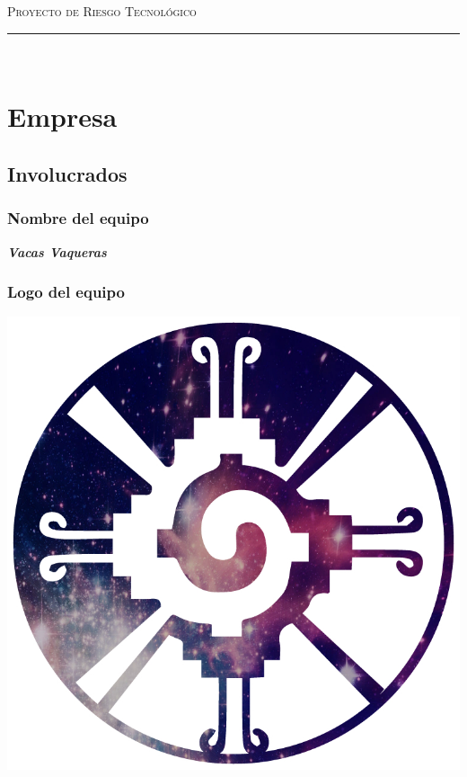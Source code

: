 \documentclass{article}
\begin{document}
\marginsize{2cm}{2cm}{1cm}{2cm} 

\begin{center}
  {\LARGE \scshape Proyecto de Riesgo Tecnológico\\\vspace{10mm} }
  \rule{0.8\textwidth}{.8pt}\\
\end{center}

\section*{Empresa}

\subsection*{Involucrados}
\subsubsection*{Nombre del equipo} \textit{\textbf{Vacas Vaqueras}}
\subsubsection*{Logo del equipo}
\begin{center}
  \includegraphics[scale=.2]{../imagenes/logo.jpg}
\end{center}
\end{document}
